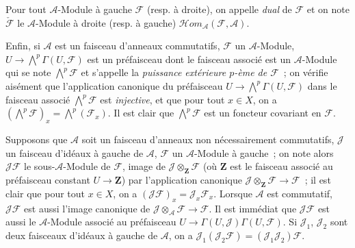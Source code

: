 \begin{env}[4.1.5]
Pour tout $\mathcal{A}$-Module à gauche $\mathcal{F}$ (resp. à droite), on
appelle \emph{dual} de $\mathcal{F}$ et on note $\check{\mathcal{F}}$ le
$\mathcal{A}$-Module à droite (resp. à gauche)
$\mathcal{H}\!om_{\mathcal{A}}(\mathcal{F},\mathcal{A})$.

Enfin, si $\mathcal{A}$ est un faisceau d'anneaux commutatifs,
$\mathcal{F}$ un $\mathcal{A}$-Module,
$U\to\bigwedge^p\Gamma(U,\mathcal{F})$ est un préfaisceau dont le
faisceau associé est un $\mathcal{A}$-Module qui se note
$\bigwedge^p\mathcal{F}$ et s'appelle la \emph{puissance extérieure $p$-ème
de $\mathcal{F}$}~; on vérifie aisément que l'application canonique du
préfaisceau $U\to\bigwedge^p\Gamma(U,\mathcal{F})$ dans le faisceau
associé $\bigwedge^p\mathcal{F}$ est \emph{injective}, et que pour tout
$x\in X$, on a
$(\bigwedge^p\mathcal{F})_x=\bigwedge^p(\mathcal{F}_x)$. Il est clair que
$\bigwedge^p\mathcal{F}$ est un foncteur covariant en $\mathcal{F}$.
\end{env}

\begin{env}[4.1.6]
\label{0.4.1.6-fr}
Supposons que $\mathcal{A}$ soit un faisceau d'anneaux non nécessairement
commutatifs, $\mathcal{J}$ un faisceau d'idéaux à gauche de $\mathcal{A}$,
$\mathcal{F}$ un $\mathcal{A}$-Module à gauche~; on note alors
$\mathcal{J}\mathcal{F}$ le sous-$\mathcal{A}$-Module de $\mathcal{F}$,
image de $\mathcal{J}\otimes_{\mathbf Z}\mathcal{F}$ (où $\mathbf Z$ est le
faisceau associé au préfaisceau constant $U\to\mathbf Z$) par l'application
canonique $\mathcal{J}\otimes_{\mathbf Z}\mathcal{F}\to\mathcal{F}$~; il est
clair que pour tout $x\in X$, on a
$(\mathcal{J}\mathcal{F})_x=\mathcal{J}_x\mathcal{F}_x$. Lorsque
$\mathcal{A}$ est commutatif, $\mathcal{J}\mathcal{F}$ est aussi l'image
canonique de $\mathcal{J}\otimes_{\mathcal{A}}\mathcal{F}\to\mathcal{F}$.
Il est immédiat que $\mathcal{J}\mathcal{F}$ est aussi le
$\mathcal{A}$-Module associé au préfaisceau
$U\to\Gamma(U,\mathcal{J})\Gamma(U,\mathcal{F})$. Si
$\mathcal{J}_1$, $\mathcal{J}_2$ sont deux faisceaux d'idéaux à gauche de
$\mathcal{A}$, on a
$\mathcal{J}_1(\mathcal{J}_2\mathcal{F})=(\mathcal{J}_1\mathcal{J}_2)\mathcal{F}$.
\end{env}

